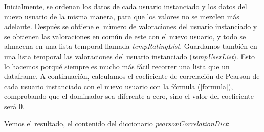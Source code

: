\documentclass{uimppracticas}
\begin{document}
Inicialmente, se ordenan los datos de cada usuario instanciado y los datos del nuevo usuario de la misma manera, para que los valores no se mezclen más adelante. Después se obtiene el número de valoraciones del usuario instanciado y se obtienen las valoraciones en común de este con el nuevo usuario, y todo se almacena en una lista temporal llamada \textit{tempRatingList}. Guardamos también en una lista temporal las valoraciones del usuario instanciado (\textit{tempUserList}). Esto lo hacemos porqué siempre es mucho más fácil recorrer una lista que un dataframe. A continuación, calculamos el coeficiente de correlación de Pearson de cada usuario instanciado con el nuevo usuario con la fórmula (\ref{formula}), comprobando que el dominador sea diferente a cero, sino el valor del coeficiente será 0.

Vemos el resultado, el contenido del diccionario \textit{pearsonCorrelationDict}:
\end{document}
